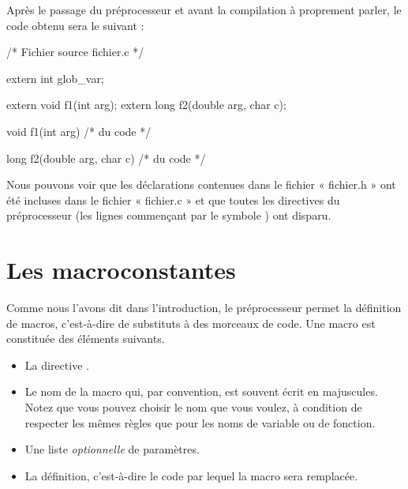 Après le passage du préprocesseur et avant la compilation à proprement
parler, le code obtenu sera le suivant :

\begin{C}
/* Fichier source fichier.c */

extern int glob_var;

extern void f1(int arg);
extern long f2(double arg, char c);

void f1(int arg)
{
    /* du code */
}

long f2(double arg, char c)
{
    /* du code */
}
\end{C}

Nous pouvons voir que les déclarations contenues dans le fichier «
fichier.h » ont été incluses dans le fichier « fichier.c » et que toutes
les directives du préprocesseur (les lignes commençant par le symbole
\mybox{\#}) ont disparu.


\section{Les macroconstantes}
\label{les-macroconstantes}

Comme nous l'avons dit dans l'introduction, le
  préprocesseur permet la définition de macros, c'est-à-dire de
  substituts à des morceaux de code. Une macro est constituée des
  éléments suivants.
  
\begin{itemize}
\item
  La directive .
\item
  Le nom de la macro qui, par convention, est souvent écrit en
  majuscules. Notez que vous pouvez choisir le nom que vous voulez, à
  condition de respecter les mêmes règles que pour les noms de variable
  ou de fonction.
\item
  Une liste \emph{optionnelle} de paramètres.
\item
  La définition, c'est-à-dire le code par lequel la macro sera
  remplacée.
\end{itemize}

